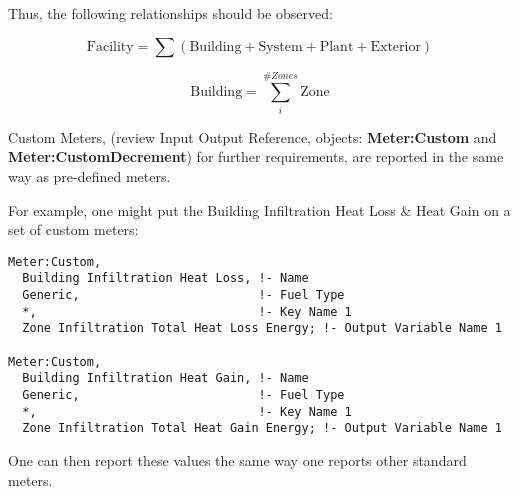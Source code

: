 Thus, the following relationships should be observed:

\begin{equation}
  \text{Facility} = \sum\left(\text{Building} + \text{System} + \text{Plant} + \text{Exterior}\right)
\end{equation}

\begin{equation}
  \text{Building} = \sum_{i}^{\#Zones} \text{Zone}
\end{equation}

Custom Meters, (review Input Output Reference, objects: \textbf{Meter:Custom} and \textbf{Meter:CustomDecrement}) for further requirements, are reported in the same way as pre-defined meters.

For example, one might put the Building Infiltration Heat Loss \& Heat Gain on a set of custom meters:

\begin{lstlisting}
Meter:Custom,
  Building Infiltration Heat Loss, !- Name
  Generic,                         !- Fuel Type
  *,                               !- Key Name 1
  Zone Infiltration Total Heat Loss Energy; !- Output Variable Name 1

Meter:Custom,
  Building Infiltration Heat Gain, !- Name
  Generic,                         !- Fuel Type
  *,                               !- Key Name 1
  Zone Infiltration Total Heat Gain Energy; !- Output Variable Name 1
\end{lstlisting}

One can then report these values the same way one reports other standard meters.
